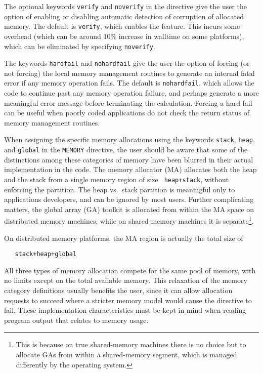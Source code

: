 The optional keywords \verb+verify+ and \verb+noverify+ in the
directive give the user the option of enabling or disabling automatic
detection of corruption of allocated memory.  The default is
\verb+verify+, which enables the feature. This incurs some
overhead (which can be around 10\% increase in walltime on some platforms),
which can be eliminated by specifying \verb+noverify+.

The keywords \verb+hardfail+ and \verb+nohardfail+ give the user the
option of forcing (or not forcing) the local memory management
routines to generate an internal fatal error if any memory operation
fails.  The default is \verb+nohardfail+, which allows the code to
continue past any memory operation failure, and perhaps generate a
more meaningful error message before terminating the calculation.
Forcing a hard-fail can be useful when poorly coded applications do
not check the return status of memory management routines.

When assigning the specific memory allocations using the keywords
\verb+stack+, \verb+heap+, and \verb+global+ in the \verb+MEMORY+
directive, the user should be aware that some of the distinctions
among these categories of memory have been blurred in their actual
implementation in the code.  The memory allocator (MA) allocates both
the heap and the stack from a single memory region of size {\tt
  heap+stack}, without enforcing the partition.  The heap vs.\ stack
partition is meaningful only to applications developers, and can be
ignored by most users.  Further complicating matters, the global array
(GA) toolkit is allocated from within the MA space on distributed
memory machines, while on shared-memory machines it is
separate\footnote{This is because on true shared-memory machines there
  is no choice but to allocate GAs from within a shared-memory
  segment, which is managed differently by the operating system.}.

On distributed memory platforms, the MA region is actually the total
size of 
\begin{verbatim}
   stack+heap+global
\end{verbatim}
All three types of memory allocation
compete for the same pool of memory, with no limits except on the
total available memory.  This relaxation of the memory category
definitions usually benefits the user, since it can allow allocation
requests to succeed where a stricter memory model would cause the
directive to fail.  These implementation characteristics must be kept
in mind when reading program output that relates to memory usage.

